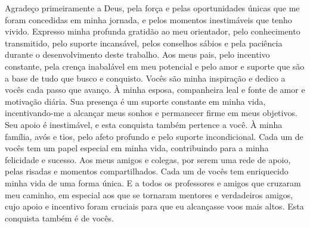 \hspace{5mm}


Agradeço primeiramente a Deus, pela força e pelas oportunidades únicas que me foram concedidas em minha jornada, e pelos momentos inestimáveis que tenho vivido. Expresso minha profunda gratidão ao meu orientador, pelo conhecimento transmitido, pelo suporte incansável, pelos conselhos sábios e pela paciência durante o desenvolvimento deste trabalho. Aos meus pais, pelo incentivo constante, pela crença inabalável em meu potencial e pelo amor e suporte que são a base de tudo que busco e conquisto. Vocês são minha inspiração e dedico a vocês cada passo que avanço. À minha esposa, companheira leal e fonte de amor e motivação diária. Sua presença é um suporte constante em minha vida, incentivando-me a alcançar meus sonhos e permanecer firme em meus objetivos. Seu apoio é inestimável, e esta conquista também pertence a você. À minha família, avós e tios, pelo afeto profundo e pelo suporte incondicional. Cada um de vocês tem um papel especial em minha vida, contribuindo para a minha felicidade e sucesso. Aos meus amigos e colegas, por serem uma rede de apoio, pelas risadas e momentos compartilhados. Cada um de vocês tem enriquecido minha vida de uma forma única. E a todos os professores e amigos que cruzaram meu caminho, em especial aos que se tornaram mentores e verdadeiros amigos, cujo apoio e incentivo foram cruciais para que eu alcançasse voos mais altos. Esta conquista também é de vocês.


